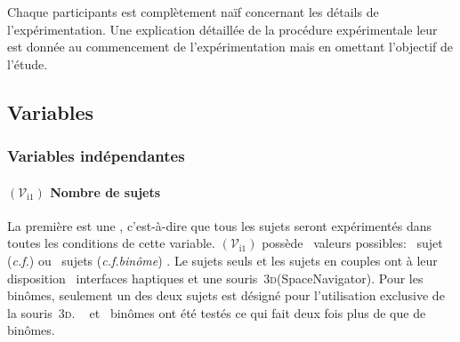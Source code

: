 \documentclass[myfrancais]{mythesis}
\newcommand{\mynum}[1]{\nombre{#1}}
\newcommand{\myvar}[2]{$\left(\mathcal{V}_{\mathrm{#1}#2}\right)$\xspace}
\newcommand{\myvari}[1]{\myvar{i}{#1}}
\newcommand{\myemph}[1]{\emph{#1}}
\newcommand{\myThreeD}{\textsc{3d}\xspace}
\newcommand{\myregistered}{\textsuperscript{\textregistered}}
\newcommand{\mySpaceNavigator}{SpaceNavigator\myregistered\xspace}
\newcommand{\mycf}{\textit{c.f.}\xspace}
\begin{document}
	Chaque participants est complètement naïf concernant les détails de l'expérimentation.
	Une explication détaillée de la procédure expérimentale leur est donnée au commencement de l'expérimentation mais en omettant l'objectif de l'étude.

	\subsection{Variables}
	\subsubsection{Variables indépendantes}
	\paragraph{\myvari{1} Nombre de sujets}
	La première  est une , c'est-à-dire que tous les sujets seront expérimentés dans toutes les conditions de cette variable.
	\myvari{1} possède \mynum{2}~valeurs possibles: \og \mynum{1}~sujet (\mycf \myemph{}) \fg ou \og \mynum{2}~sujets (\mycf \myemph{binôme}) \fg.
	Le sujets seuls et les sujets en couples ont à leur disposition \mynum{2}~interfaces haptiques et une souris~\myThreeD (\mySpaceNavigator).
	Pour les binômes, seulement un des deux sujets est désigné pour l'utilisation exclusive de la souris~\myThreeD.
	\mynum{24}~ et \mynum{12}~binômes ont été testés ce qui fait deux fois plus de  que de binômes.
\end{document}
